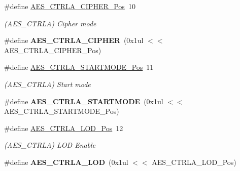 \begin{DoxyCompactItemize}
\item 
\hypertarget{group___s_a_m_l21___a_e_s_ga25c49e1e3486f33caa38cdffaecd2024}{}\#define \hyperlink{group___s_a_m_l21___a_e_s_ga25c49e1e3486f33caa38cdffaecd2024}{A\+E\+S\+\_\+\+C\+T\+R\+L\+A\+\_\+\+C\+I\+P\+H\+E\+R\+\_\+\+Pos}~10\label{group___s_a_m_l21___a_e_s_ga25c49e1e3486f33caa38cdffaecd2024}

\begin{DoxyCompactList}\small\item\em (A\+E\+S\+\_\+\+C\+T\+R\+L\+A) Cipher mode \end{DoxyCompactList}\item 
\hypertarget{group___s_a_m_l21___a_e_s_gac564c1ac0494b0a74cbbbb1d6d0204af}{}\#define {\bfseries A\+E\+S\+\_\+\+C\+T\+R\+L\+A\+\_\+\+C\+I\+P\+H\+E\+R}~(0x1ul $<$$<$ A\+E\+S\+\_\+\+C\+T\+R\+L\+A\+\_\+\+C\+I\+P\+H\+E\+R\+\_\+\+Pos)\label{group___s_a_m_l21___a_e_s_gac564c1ac0494b0a74cbbbb1d6d0204af}

\item 
\hypertarget{group___s_a_m_l21___a_e_s_ga785ffe6bd686b87bd010931ffd325043}{}\#define \hyperlink{group___s_a_m_l21___a_e_s_ga785ffe6bd686b87bd010931ffd325043}{A\+E\+S\+\_\+\+C\+T\+R\+L\+A\+\_\+\+S\+T\+A\+R\+T\+M\+O\+D\+E\+\_\+\+Pos}~11\label{group___s_a_m_l21___a_e_s_ga785ffe6bd686b87bd010931ffd325043}

\begin{DoxyCompactList}\small\item\em (A\+E\+S\+\_\+\+C\+T\+R\+L\+A) Start mode \end{DoxyCompactList}\item 
\hypertarget{group___s_a_m_l21___a_e_s_ga7f652048efc1b2f0ce7610881a109178}{}\#define {\bfseries A\+E\+S\+\_\+\+C\+T\+R\+L\+A\+\_\+\+S\+T\+A\+R\+T\+M\+O\+D\+E}~(0x1ul $<$$<$ A\+E\+S\+\_\+\+C\+T\+R\+L\+A\+\_\+\+S\+T\+A\+R\+T\+M\+O\+D\+E\+\_\+\+Pos)\label{group___s_a_m_l21___a_e_s_ga7f652048efc1b2f0ce7610881a109178}

\item 
\hypertarget{group___s_a_m_l21___a_e_s_gaf6e4b7aee8ec535dfaf64b94f3df787a}{}\#define \hyperlink{group___s_a_m_l21___a_e_s_gaf6e4b7aee8ec535dfaf64b94f3df787a}{A\+E\+S\+\_\+\+C\+T\+R\+L\+A\+\_\+\+L\+O\+D\+\_\+\+Pos}~12\label{group___s_a_m_l21___a_e_s_gaf6e4b7aee8ec535dfaf64b94f3df787a}

\begin{DoxyCompactList}\small\item\em (A\+E\+S\+\_\+\+C\+T\+R\+L\+A) L\+O\+D Enable \end{DoxyCompactList}\item 
\hypertarget{group___s_a_m_l21___a_e_s_ga894e7837b51c42802e9d2fbb5f036fde}{}\#define {\bfseries A\+E\+S\+\_\+\+C\+T\+R\+L\+A\+\_\+\+L\+O\+D}~(0x1ul $<$$<$ A\+E\+S\+\_\+\+C\+T\+R\+L\+A\+\_\+\+L\+O\+D\+\_\+\+Pos)\label{group___s_a_m_l21___a_e_s_ga894e7837b51c42802e9d2fbb5f036fde}


\end{DoxyCompactItemize}
